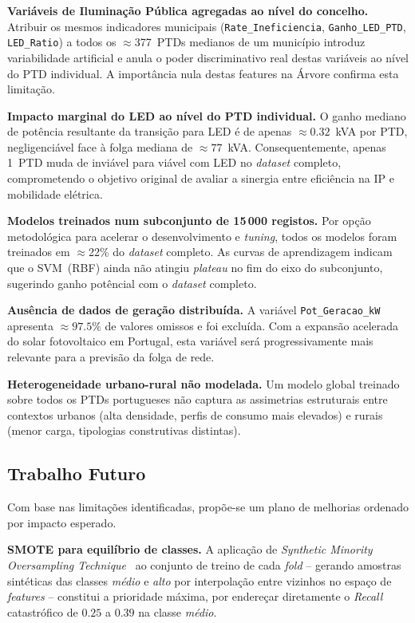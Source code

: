 \documentclass[conference]{IEEEtran}
\begin{document}
\textbf{Vari\'aveis de Ilumina\c{c}\~ao P\'ublica agregadas ao n\'ivel
do concelho.} Atribuir os mesmos indicadores municipais
(\texttt{Rate\_Ineficiencia}, \texttt{Ganho\_LED\_PTD}, \texttt{LED\_Ratio})
a todos os $\approx$377~PTDs medianos de um munic\'ipio introduz
variabilidade artificial e anula o poder discriminativo real destas
vari\'aveis ao n\'ivel do PTD individual. A import\^ancia nula destas
features na \'Arvore confirma esta limita\c{c}\~ao.
 
\textbf{Impacto marginal do LED ao n\'ivel do PTD individual.}
O ganho mediano de pot\^encia resultante da transi\c{c}\~ao para LED
\'e de apenas $\approx0.32$~kVA por PTD, negligenci\'avel face \`a
folga mediana de $\approx77$~kVA. Consequentemente, apenas 1~PTD muda
de invi\'avel para vi\'avel com LED no \textit{dataset} completo,
comprometendo o objetivo original de avaliar a sinergia entre efici\^encia
na IP e mobilidade el\'etrica.
 
\textbf{Modelos treinados num subconjunto de 15\,000 registos.} Por
op\c{c}\~ao metodol\'ogica para acelerar o desenvolvimento e
\textit{tuning}, todos os modelos foram treinados em $\approx$22\% do
\textit{dataset} completo. As curvas de aprendizagem indicam que o
SVM~(RBF) ainda n\~ao atingiu \textit{plateau} no fim do eixo do
subconjunto, sugerindo ganho pot\^encial com o \textit{dataset} completo.
 
\textbf{Ausência de dados de gera\c{c}\~ao distribu\'ida.} A vari\'avel
\texttt{Pot\_Geracao\_kW} apresenta $\approx97.5\%$ de valores omissos
e foi exclu\'ida. Com a expans\~ao acelerada do solar fotovoltaico em
Portugal, esta vari\'avel ser\'a progressivamente mais relevante para
a previs\~ao da folga de rede.
 
\textbf{Heterogeneidade urbano-rural n\~ao modelada.} Um modelo global
treinado sobre todos os PTDs portugueses n\~ao captura as assimetrias
estruturais entre contextos urbanos (alta densidade, perfis de consumo
mais elevados) e rurais (menor carga, tipologias construtivas distintas).
 
\subsection{Trabalho Futuro}
 
Com base nas limita\c{c}\~oes identificadas, prop\~oe-se um plano de
melhorias ordenado por impacto esperado.
 
\textbf{SMOTE para equil\'ibrio de classes.} A aplica\c{c}\~ao de
\textit{Synthetic Minority Oversampling Technique}~\cite{b6} ao conjunto
de treino de cada \textit{fold} -- gerando amostras sint\'eticas das classes
\textit{m\'edio} e \textit{alto} por interpola\c{c}\~ao entre vizinhos
no espa\c{c}o de \textit{features} -- constitui a prioridade m\'axima,
por endere\c{c}ar diretamente o \textit{Recall} catastr\'ofico de
$0.25$ a $0.39$ na classe \textit{m\'edio}.
 
\end{document}
